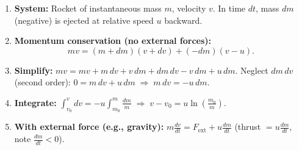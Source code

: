 \documentclass[11pt]{article}
\begin{document}
\begin{methode}
\begin{enumerate}
    \item \textbf{System:} Rocket of instantaneous mass $m$, velocity $v$. In time $dt$, mass $dm$ (negative) is ejected at relative speed $u$ backward.
    \item \textbf{Momentum conservation (no external forces):}
    \[
    mv = (m+dm)(v+dv) + (-dm)(v-u).
    \]
    \item \textbf{Simplify:} $mv = mv + m\,dv + v\,dm + dm\,dv - v\,dm + u\,dm$.
    Neglect $dm\,dv$ (second order): $0 = m\,dv + u\,dm \;\Rightarrow\; m\,dv = -u\,dm$.
    \item \textbf{Integrate:} $\int_{v_0}^{v} dv = -u \int_{m_0}^{m} \frac{dm}{m} \;\Rightarrow\; v - v_0 = u \ln\left(\frac{m_0}{m}\right)$.
    \item \textbf{With external force (e.g., gravity):} $m\frac{dv}{dt} = F_{\text{ext}} + u\frac{dm}{dt}$ (thrust $= u\frac{dm}{dt}$, note $\frac{dm}{dt}<0$).
\end{enumerate}
\end{methode}
\end{document}
